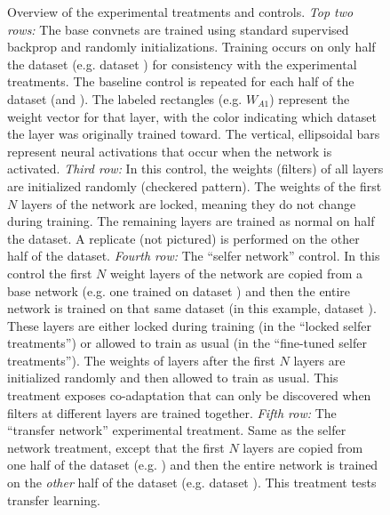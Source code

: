 \begin{figure}[htpb]
\caption{Overview of the experimental treatments and controls. \emph{Top two rows:} The base convnets are trained using standard supervised backprop and randomly initializations. Training occurs on only half the dataset (e.g. dataset \dA) for consistency with the experimental treatments. The baseline control is repeated for each half of the dataset (\dA and \dB). The labeled rectangles (e.g. $W_{A1}$) represent the weight vector for that layer, with the color indicating which dataset the layer was originally trained toward. The vertical, ellipsoidal bars represent neural activations that occur when the network is activated. \emph{Third row:} In this control, the weights (filters) of all layers are initialized randomly (checkered pattern). The weights of the first $N$ layers of the network are locked, meaning they do not change during training. The remaining layers are trained as normal on half the dataset. A replicate (not pictured) is performed on the other half of the dataset. \emph{Fourth row:} The ``selfer network'' control. In this control the first $N$ weight layers of the network are copied from a base network (e.g. one trained on dataset \dB) and then the entire network is trained on that same dataset (in this example, dataset \dB). These layers are either locked during training (in the ``locked selfer treatments'') or allowed to train as usual (in the ``fine-tuned selfer treatments''). The weights of layers after the first $N$ layers are initialized randomly and then allowed to train as usual. This treatment exposes co-adaptation that can only be discovered when filters at different layers are trained together. \emph{Fifth row:} The ``transfer network'' experimental treatment. Same as the selfer network treatment, except that the first $N$ layers are copied from one half of the dataset (e.g. \dA) and then the entire network is trained on the \emph{other} half of the dataset (e.g. dataset \dB). This treatment tests transfer learning.}
\label{fig:transfer}
\end{figure}


